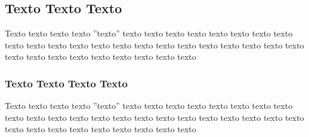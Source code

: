 \subsection{Texto Texto Texto}
\label{sub:outrasubsection2}

Texto texto texto texto ''texto'' texto texto texto texto texto texto texto texto texto texto texto texto texto texto texto texto texto texto texto texto texto texto texto texto texto texto texto texto texto texto texto


\subsubsection{Texto Texto Texto Texto}
\label{subsub:outrasubsubsection2}

Texto texto texto texto ''texto'' texto texto texto texto texto texto texto texto texto texto texto texto texto texto texto texto texto texto texto texto texto texto texto texto texto texto texto texto texto texto texto
